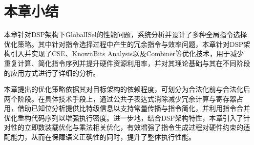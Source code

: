 \section{本章小结}
本章针对DSP架构下GlobalISel的性能问题，系统分析并设计了多种全局指令选择优化策略。其中针对指令选择过程中产生的冗余指令与效率问题，本章针对DSP架构引入并实现了CSE、KnownBits Analysis以及Combiner等优化技术，用于减少重复计算、简化指令序列并提升硬件资源利用率，并对其理论基础与其在不同阶段的应用方式进行了详细的分析。

\par

本章提出的优化策略依据其对目标架构的依赖程度，可划分为合法化前与合法化后两个阶段。在具体技术手段上，通过公共子表达式消除减少冗余计算与寄存器占用，借助已知位分析提供比特级信息以支持常量传播与指令简化，并利用指令合并优化重构代码序列以增强执行密度。进一步地，结合DSP架构特性，本章引入了针对性的立即数装载优化与乘法相关优化，有效增强了指令生成过程对硬件约束的适配能力，从而在保障语义正确性的同时，提升了整体执行性能。
